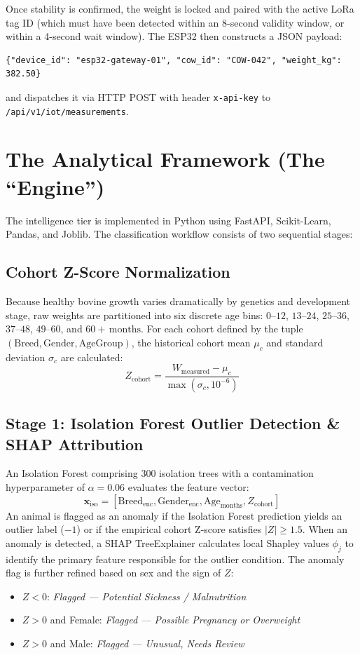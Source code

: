 \documentclass[11pt,a4paper]{report}
\begin{document}
Once stability is confirmed, the weight is locked and paired with the active LoRa tag ID (which must have been detected within an 8-second validity window, or within a 4-second wait window). The ESP32 then constructs a JSON payload:
\begin{verbatim}
{"device_id": "esp32-gateway-01", "cow_id": "COW-042", "weight_kg": 382.50}
\end{verbatim}
and dispatches it via HTTP POST with header \texttt{x-api-key} to \texttt{/api/v1/iot/measurements}.

\section{The Analytical Framework (The ``Engine'')}
The intelligence tier is implemented in Python using FastAPI, Scikit-Learn, Pandas, and Joblib. The classification workflow consists of two sequential stages:

\subsection{Cohort Z-Score Normalization}
Because healthy bovine growth varies dramatically by genetics and development stage, raw weights are partitioned into six discrete age bins: $0\text{--}12$, $13\text{--}24$, $25\text{--}36$, $37\text{--}48$, $49\text{--}60$, and $60+\,\text{months}$. For each cohort defined by the tuple $(\text{Breed}, \text{Gender}, \text{AgeGroup})$, the historical cohort mean $\mu_c$ and standard deviation $\sigma_c$ are calculated:
\begin{equation}
    Z_{\text{cohort}} = \frac{W_{\text{measured}} - \mu_c}{\max(\sigma_c, 10^{-6})}
\end{equation}

\subsection{Stage 1: Isolation Forest Outlier Detection \& SHAP Attribution}
An Isolation Forest comprising 300 isolation trees with a contamination hyperparameter of $\alpha = 0.06$ evaluates the feature vector:
\begin{equation}
    \mathbf{x}_{\text{iso}} = [\text{Breed}_{\text{enc}}, \text{Gender}_{\text{enc}}, \text{Age}_{\text{months}}, Z_{\text{cohort}}]
\end{equation}
An animal is flagged as an anomaly if the Isolation Forest prediction yields an outlier label ($-1$) or if the empirical cohort Z-score satisfies $|Z| \ge 1.5$. When an anomaly is detected, a SHAP TreeExplainer calculates local Shapley values $\phi_j$ to identify the primary feature responsible for the outlier condition. The anomaly flag is further refined based on sex and the sign of $Z$:
\begin{itemize}
    \item $Z < 0$: \textit{Flagged --- Potential Sickness / Malnutrition}
    \item $Z > 0$ and Female: \textit{Flagged --- Possible Pregnancy or Overweight}
    \item $Z > 0$ and Male: \textit{Flagged --- Unusual, Needs Review}
\end{itemize}
\end{document}
